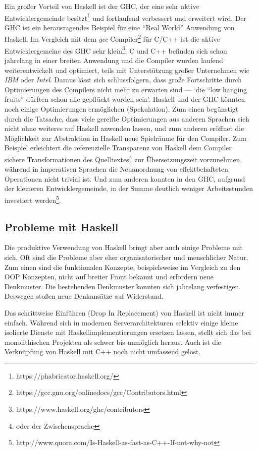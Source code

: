 Ein großer Vorteil von Haskell ist der \ac{GHC}, der eine sehr aktive Entwicklergemeinde besitzt\footnote{https://phabricator.haskell.org/} und fortlaufend verbessert und erweitert wird. Der \ac{GHC} ist ein herausragendes Beispiel für eine "`Real World"' Anwendung von Haskell. Im Vergleich mit dem \textit{gcc} Compiler\footnote{https://gcc.gnu.org/onlinedocs/gcc/Contributors.html} für C/C++ ist die aktive Entwicklergemeine des \ac{GHC} sehr klein\footnote{https://www.haskell.org/ghc/contributors}. C und C++ befinden sich schon jahrelang in einer breiten Anwendung und die Compiler wurden laufend weiterentwickelt und optimiert, teils mit Unterstützung großer Unternehmen wie \textit{IBM} oder \textit{Intel}. Daraus lässt sich schlussfolgern, dass große Fortschritte durch Optimierungen des Compilers nicht mehr zu erwarten sind --- `die "`low hanging fruits"' dürften schon alle gepflückt worden sein'. Haskell und der \ac{GHC} könnten noch einige Optimierungen ermöglichen (Spekulation). Zum einen begünstigt durch die Tatsache, dass viele gereifte Optimierungen aus anderen Sprachen sich nicht ohne weiteres auf Haskell anwenden lassen, und zum anderen eröffnet die Möglichkeit zur Abstraktion in Haskell neue Spielräume für den Compiler. Zum Beispiel erleichtert die referenzielle Transparenz von Haskell dem Compiler sichere Transformationen des Quelltextes\footnote{oder der Zwischensprache} zur Übersetzungszeit vorzunehmen, während in imperativen Sprachen die Neuanordnung von effektbehafteten Operationen nicht trivial ist. Und zum anderen konnten in den \ac{GHC}, aufgrund der kleineren Entwicklergemeinde, in der Summe deutlich weniger Arbeitsstunden investiert werden\footnote{http://www.quora.com/Is-Haskell-as-fast-as-C++-If-not-why-not}.

\subsection{Probleme mit Haskell}\label{sec:probleme-haskell}


Die produktive Verwendung von Haskell bringt aber auch einige Probleme mit sich. Oft sind die Probleme aber eher organisatorischer und menschlicher Natur. Zum einen sind die funktionalen Konzepte, beispielsweise im Vergleich zu den OOP Konzepten, nicht auf breiter Front bekannt und erfordern neue Denkmuster. Die bestehenden Denkmuster konnten sich jahrelang verfestigen. Deswegen stoßen neue Denkansätze auf Widerstand.

Das schrittweise Einführen (Drop In Replacement) von Haskell ist nicht immer einfach. Während sich in modernen Serverarchitekturen selektiv einige kleine isolierte Dienste mit Haskellimplementierungen ersetzen lassen, stellt sich das bei monolithischen Projekten als schwer bis unmöglich heraus. Auch ist die Verknüpfung von Haskell mit C++ noch nicht umfassend gelöst.


